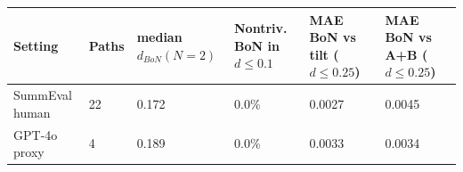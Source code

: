 \begin{tabular}{llllll}
\toprule
Setting & Paths & median $d_{BoN}(N=2)$ & Nontriv. BoN in $d\le0.1$ & MAE BoN vs tilt ($d\le0.25$) & MAE BoN vs A+B ($d\le0.25$) \\
\midrule
SummEval human & 22 & 0.172 & 0.0\% & 0.0027 & 0.0045 \\
GPT-4o proxy & 4 & 0.189 & 0.0\% & 0.0033 & 0.0034 \\
\bottomrule
\end{tabular}

